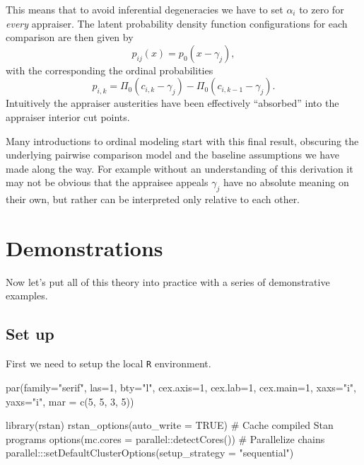 \documentclass[
  letterpaper,
  DIV=11,
  numbers=noendperiod]{scrartcl}
\newenvironment{Shaded}{\begin{snugshade}}{\end{snugshade}}
\newcommand{\AttributeTok}[1]{\textcolor[rgb]{0.40,0.45,0.13}{#1}}
\newcommand{\CommentTok}[1]{\textcolor[rgb]{0.37,0.37,0.37}{#1}}
\newcommand{\ConstantTok}[1]{\textcolor[rgb]{0.56,0.35,0.01}{#1}}
\newcommand{\DecValTok}[1]{\textcolor[rgb]{0.68,0.00,0.00}{#1}}
\newcommand{\FunctionTok}[1]{\textcolor[rgb]{0.28,0.35,0.67}{#1}}
\newcommand{\NormalTok}[1]{\textcolor[rgb]{0.00,0.23,0.31}{#1}}
\newcommand{\SpecialCharTok}[1]{\textcolor[rgb]{0.37,0.37,0.37}{#1}}
\newcommand{\StringTok}[1]{\textcolor[rgb]{0.13,0.47,0.30}{#1}}
\begin{document}
This means that to avoid inferential degeneracies we have to set
\(\alpha_{i}\) to zero for \emph{every} appraiser. The latent
probability density function configurations for each comparison are then
given by \[
p_{ij}(x) = p_{0}( x - \gamma_{j} ),
\] with the corresponding the ordinal probabilities \[
p_{i, k} =
  \Pi_{0}( c_{i, k}     - \gamma_{j} )
- \Pi_{0}( c_{i, k - 1} - \gamma_{j} ).
\] Intuitively the appraiser austerities have been effectively
``absorbed'' into the appraiser interior cut points.

Many introductions to ordinal modeling start with this final result,
obscuring the underlying pairwise comparison model and the baseline
assumptions we have made along the way. For example without an
understanding of this derivation it may not be obvious that the
appraisee appeals \(\gamma_{j}\) have no absolute meaning on their own,
but rather can be interpreted only relative to each other.

\section{Demonstrations}\label{demonstrations}

Now let's put all of this theory into practice with a series of
demonstrative examples.

\subsection{Set up}\label{set-up}

First we need to setup the local \texttt{R} environment.

\begin{Shaded}
\begin{Highlighting}[]
\FunctionTok{par}\NormalTok{(}\AttributeTok{family=}\StringTok{"serif"}\NormalTok{, }\AttributeTok{las=}\DecValTok{1}\NormalTok{, }\AttributeTok{bty=}\StringTok{"l"}\NormalTok{,}
    \AttributeTok{cex.axis=}\DecValTok{1}\NormalTok{, }\AttributeTok{cex.lab=}\DecValTok{1}\NormalTok{, }\AttributeTok{cex.main=}\DecValTok{1}\NormalTok{,}
    \AttributeTok{xaxs=}\StringTok{"i"}\NormalTok{, }\AttributeTok{yaxs=}\StringTok{"i"}\NormalTok{, }\AttributeTok{mar =} \FunctionTok{c}\NormalTok{(}\DecValTok{5}\NormalTok{, }\DecValTok{5}\NormalTok{, }\DecValTok{3}\NormalTok{, }\DecValTok{5}\NormalTok{))}
\end{Highlighting}
\end{Shaded}

\begin{Shaded}
\begin{Highlighting}[]
\FunctionTok{library}\NormalTok{(rstan)}
\FunctionTok{rstan\_options}\NormalTok{(}\AttributeTok{auto\_write =} \ConstantTok{TRUE}\NormalTok{)            }\CommentTok{\# Cache compiled Stan programs}
\FunctionTok{options}\NormalTok{(}\AttributeTok{mc.cores =}\NormalTok{ parallel}\SpecialCharTok{::}\FunctionTok{detectCores}\NormalTok{()) }\CommentTok{\# Parallelize chains}
\NormalTok{parallel}\SpecialCharTok{:::}\FunctionTok{setDefaultClusterOptions}\NormalTok{(}\AttributeTok{setup\_strategy =} \StringTok{"sequential"}\NormalTok{)}
\end{Highlighting}
\end{Shaded}
\end{document}
